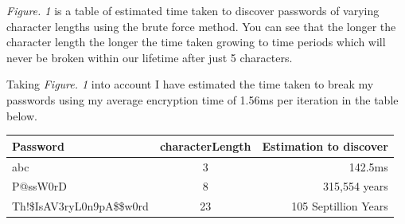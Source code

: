 \documentclass[a4paper, twoside, 11pt]{article}
\begin{document}
 \textit{Figure. 1} is a table of estimated time taken to discover passwords of varying character lengths using the brute force method. 
 You can see that the longer the character length the longer the time taken growing to time periods which will never be broken within
  our lifetime after just 5 characters. 

  Taking \textit{Figure. 1} into account I have estimated the time taken to break my passwords using my average encryption time of 1.56ms per iteration in the table below.

  \begin{center}
	\begin{tabular}{ |l|c|r| } 
	 \hline
	 Password & characterLength & Estimation to discover \\
	 \hline
	 abc & 3 & 142.5ms \\
	 P@ssW0rD & 8 & 315,554 years \\
	 Th!\$IsAV3ryL0n9pA\$\$w0rd & 23 & 105 Septillion Years \\
	 \hline
	\end{tabular}
\end{center}

  \newpage
\end{document}
